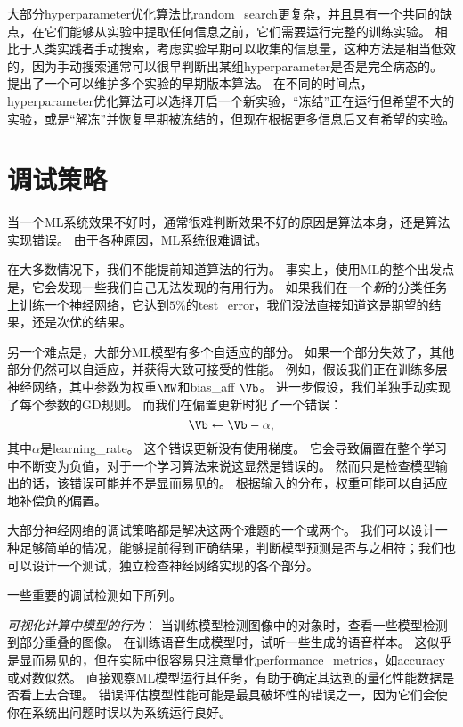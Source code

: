 大部分\gls{hyperparameter}优化算法比\gls{random_search}更复杂，并且具有一个共同的缺点，在它们能够从实验中提取任何信息之前，它们需要运行完整的训练实验。
相比于人类实践者手动搜索，考虑实验早期可以收集的信息量，这种方法是相当低效的，因为手动搜索通常可以很早判断出某组\gls{hyperparameter}是否是完全病态的。
\cite{swersky2014freeze}提出了一个可以维护多个实验的早期版本算法。
在不同的时间点，\gls{hyperparameter}优化算法可以选择开启一个新实验，``冻结''正在运行但希望不大的实验，或是``解冻''并恢复早期被冻结的，但现在根据更多信息后又有希望的实验。


\section{调试策略}
\label{sec:debugging_strategies}
当一个\gls{ML}系统效果不好时，通常很难判断效果不好的原因是算法本身，还是算法实现错误。
由于各种原因，\gls{ML}系统很难调试。


在大多数情况下，我们不能提前知道算法的行为。
事实上，使用\gls{ML}的整个出发点是，它会发现一些我们自己无法发现的有用行为。
如果我们在一个\emph{新}的分类任务上训练一个神经网络，它达到$5\%$的\gls{test_error}，我们没法直接知道这是期望的结果，还是次优的结果。


另一个难点是，大部分\gls{ML}模型有多个自适应的部分。
如果一个部分失效了，其他部分仍然可以自适应，并获得大致可接受的性能。
例如，假设我们正在训练多层神经网络，其中参数为权重$\MW$和\gls{bias_aff} $\Vb$。
进一步假设，我们单独手动实现了每个参数的\gls{GD}规则。
而我们在偏置更新时犯了一个错误：
\begin{equation}
	\Vb \leftarrow \Vb - \alpha,
\end{equation}
其中$\alpha$是\gls{learning_rate}。
这个错误更新没有使用梯度。
它会导致偏置在整个学习中不断变为负值，对于一个学习算法来说这显然是错误的。 
然而只是检查模型输出的话，该错误可能并不是显而易见的。
根据输入的分布，权重可能可以自适应地补偿负的偏置。


大部分神经网络的调试策略都是解决这两个难题的一个或两个。
我们可以设计一种足够简单的情况，能够提前得到正确结果，判断模型预测是否与之相符；我们也可以设计一个测试，独立检查神经网络实现的各个部分。


一些重要的调试检测如下所列。

\emph{可视化计算中模型的行为}：%
当训练模型检测图像中的对象时，查看一些模型检测到部分重叠的图像。
在训练语音生成模型时，试听一些生成的语音样本。
这似乎是显而易见的，但在实际中很容易只注意量化\gls{performance_metrics}，如\gls{accuracy}或对数似然。
直接观察\gls{ML}模型运行其任务，有助于确定其达到的量化性能数据是否看上去合理。
错误评估模型性能可能是最具破坏性的错误之一，因为它们会使你在系统出问题时误以为系统运行良好。


